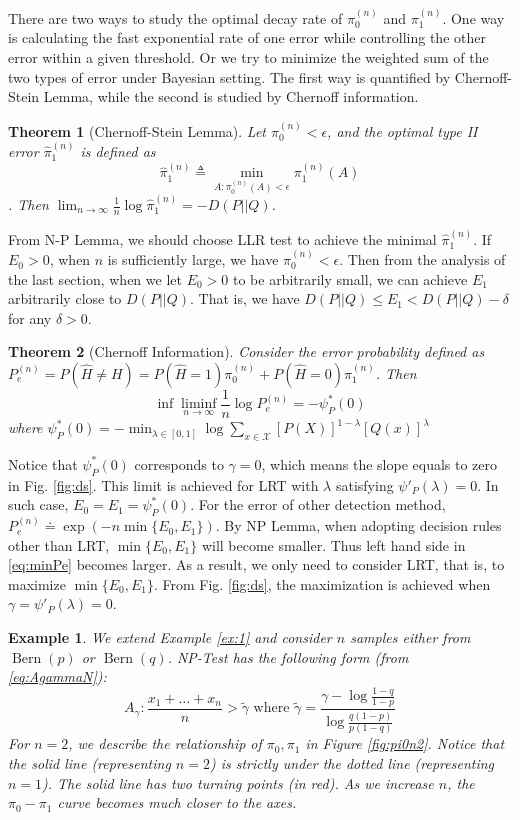 \documentclass{article}
\DeclareMathOperator{\Bern}{Bern}
\newtheorem{theorem}{Theorem}
\newtheorem{example}{Example}
\begin{document}
There are two ways to study the optimal decay rate of $\pi_0^{(n)}$
and $\pi_1^{(n)}$. One way is calculating the fast exponential rate
of one error while controlling the other error within a given threshold. Or we try to minimize the weighted sum of the
two types of error
under Bayesian setting.
The first way is quantified by Chernoff-Stein Lemma, while the second is studied by Chernoff information.
\begin{theorem}[Chernoff-Stein Lemma]\label{thm:csl}
Let $\pi_0^{(n)} < \epsilon$,
and the optimal type II error $\hat{\pi}_1^{(n)}$
is defined as
$$
\hat{\pi}_1^{(n)} \triangleq \min_{A: \pi_0^{(n)}(A)<\epsilon}\pi_1^{(n)} (A)
$$.
Then $\lim_{n\to\infty} \frac{1}{n} \log \hat{\pi}_1^{(n)}
= -D(P||Q)
$.
\end{theorem}
From N-P Lemma, we should choose LLR test to achieve the 
minimal $\hat{\pi}_1^{(n)}$. If $E_0>0$, when $n$ is sufficiently
large, we have $\pi_0^{(n)} < \epsilon$.
Then from the analysis of the last
section, when we let $E_0 > 0$ to be arbitrarily small, we can
achieve $E_1$ arbitrarily close to $D(P||Q)$. That is,
we have $D(P||Q) \leq E_1 < D(P||Q) - \delta$ for any $\delta > 0$.
\begin{theorem}[Chernoff Information]
Consider the error probability defined as
$P_e^{(n)}=P(\widehat{H}\neq H)
=P(\widehat{H}=1)\pi^{(n)}_0
+P(\widehat{H}=0)\pi^{(n)}_1$. Then
\begin{equation}\label{eq:minPe}
    \inf \liminf_{n\to\infty}
    \frac{1}{n} \log P_e^{(n)}
    = - \psi_P^*(0)
\end{equation}
where $\psi_P^*(0)=-\min_{\lambda \in [0,1]}
\log \sum_{x\in \mathcal{X}}[P(X)]^{1-\lambda}[Q(x)]^{\lambda}
$
\end{theorem}
Notice that $\psi_P^*(0)$ corresponds to $\gamma=0$,
which means the slope equals to zero in Fig.
\ref{fig:ds}. This limit is achieved for LRT
with $\lambda$ satisfying $\psi'_P(\lambda)=0$.
In such case, $E_0=E_1=\psi_P^*(0)$.
For the error of other detection
method, $P_e^{(n)}\doteq \exp(-n \min\{E_0, E_1\})$.
By NP Lemma, when adopting decision rules other than
LRT, $\min\{E_0, E_1\}$ will become smaller. Thus
left hand side in \eqref{eq:minPe} becomes
larger. As a result, we only need to consider
LRT, that is, to maximize $\min\{E_0, E_1\}$.
From Fig.
\ref{fig:ds}, the maximization is achieved
when $\gamma=\psi'_P(\lambda)=0$.
\begin{example}\label{ex:2}
We extend Example \ref{ex:1} and consider
$n$ samples either from $\Bern(p)$ or $\Bern(q)$.
NP-Test has the following form (from \eqref{eq:AgammaN}):
\begin{equation}
A_{\gamma}: \frac{x_1 + \dots + x_n}{n} > \tilde{\gamma} \textrm{ where } \tilde{\gamma}
= \frac{\gamma - \log \frac{1-q}{1-p} }{\log \frac{q(1-p)}{p(1-q)}}
\end{equation}
For $n=2$, we describe the relationship
of $\pi_0, \pi_1$ in Figure \ref{fig:pi0n2}. Notice
that the solid line (representing $n=2$) is strictly
under the dotted line (representing $n=1$). The solid
line has two turning points (in red). As we increase $n$,
the $\pi_0-\pi_1$ curve becomes much closer to
the axes.
\end{example}
\end{document}
